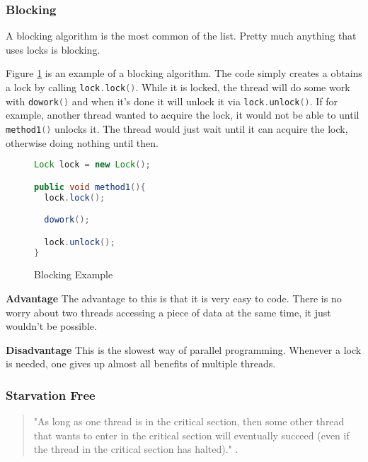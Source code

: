 \documentclass[letterpaper, 12pt]{article}
\newcommand{\inlinecode}[1]{\colorbox{codegrey}{\lstinline[language=C++]{#1}}}
\begin{document}
\subsubsection{Blocking}
A blocking algorithm is the most common of the list. Pretty much anything that uses locks is 
blocking. 
\par\vspace{\baselineskip}

Figure \ref{code:block_ex} is an example of a blocking algorithm.
The code simply creates a obtains a lock by calling \inlinecode{lock.lock()}. While it is locked, 
the thread will do some work with \inlinecode{dowork()} and when it's done it will unlock it via 
\inlinecode{lock.unlock()}. If for example, another thread wanted to acquire the lock, it would not be 
able to until \inlinecode{method1()} unlocks it. The thread would just wait until it can acquire the 
lock, otherwise doing nothing until then.
\par\vspace{\baselineskip}

\begin{figure}[H]
\begin{lstlisting}[language=Java]
Lock lock = new Lock();

public void method1(){
  lock.lock();

  dowork();

  lock.unlock();
}
\end{lstlisting}
\caption{Blocking Example}
\label{code:block_ex}
\end{figure}	


{\bfseries Advantage}\newline
The advantage to this is that it is very easy to code. There is no worry about two threads 
accessing a piece of data at the same time, it just wouldn't be possible.
\par\vspace{\baselineskip}

{\bfseries Disadvantage}\newline
This is the slowest way of parallel programming. Whenever a lock is needed, one gives up 
almost all benefits of multiple threads.

\newpage
\subsubsection{Starvation Free}

\begin{quotation}
"As long as one thread is in the critical section, then some other thread that wants 
to enter in the critical section will eventually succeed (even if the thread in the 
critical section has halted)." \citep{artofmulti}.
\end{quotation}
\end{document}
